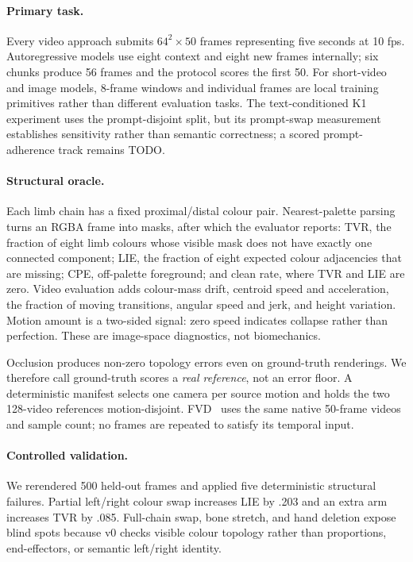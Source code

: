 \documentclass[10pt,twocolumn]{article}
\begin{document}
\paragraph{Primary task.} Every video approach submits $64^2\!\times\!50$ frames representing five seconds at 10
fps. Autoregressive models use eight context and eight new frames internally; six chunks produce 56 frames and the
protocol scores the first 50. For short-video and image models, 8-frame windows and individual frames are local
training primitives rather than different evaluation tasks. The text-conditioned K1 experiment uses the
prompt-disjoint split, but its prompt-swap measurement establishes sensitivity rather than semantic correctness;
a scored prompt-adherence track remains TODO.

\paragraph{Structural oracle.} Each limb chain has a fixed proximal/distal colour pair. Nearest-palette parsing turns
an RGBA frame into masks, after which the evaluator reports: TVR, the fraction of eight limb colours whose visible mask
does not have exactly one connected component; LIE, the fraction of eight expected colour adjacencies that are missing;
CPE, off-palette foreground; and clean rate, where TVR and LIE are zero. Video evaluation adds colour-mass drift,
centroid speed and acceleration, the fraction of moving transitions, angular speed and jerk, and
height variation. Motion amount is a two-sided signal: zero speed indicates collapse rather than perfection. These are
image-space diagnostics, not biomechanics.

Occlusion produces non-zero topology errors even on ground-truth renderings. We therefore call ground-truth scores a
\emph{real reference}, not an error floor. A deterministic manifest selects one camera per source motion and holds the
two 128-video references motion-disjoint. FVD~\cite{unterthiner2018fvd} uses the same native 50-frame videos and sample
count; no frames are repeated to satisfy its temporal input.

\paragraph{Controlled validation.} We rerendered 500 held-out frames and applied five deterministic structural
failures. Partial left/right colour swap increases LIE by .203 and an extra arm increases TVR by .085. Full-chain swap,
bone stretch, and hand deletion expose blind spots because v0 checks visible colour topology rather than proportions,
end-effectors, or semantic left/right identity.
\end{document}

